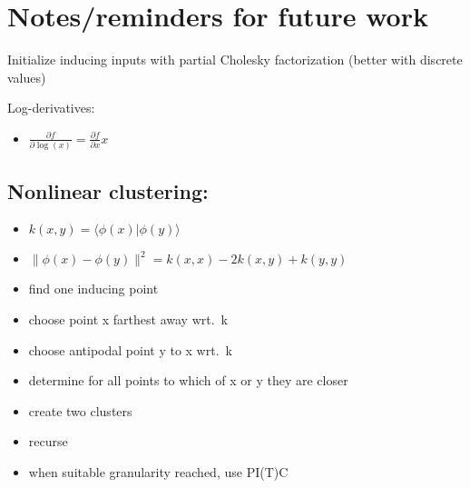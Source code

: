 \documentclass[10pt]{report}
\begin{document}
\chapter{Notes/reminders for future work}

Initialize inducing inputs with partial Cholesky factorization
(better with discrete values)

Log-derivatives:

\begin{itemize}
\item $\tfrac{\partial f}{\partial \log(x)} = \tfrac{\partial f}{\partial x} x$
\end{itemize}

\section{Nonlinear clustering:}

\begin{itemize}
\item $k(x, y) = \langle \phi(x) | \phi(y) \rangle$
\item $\|\phi(x) - \phi(y)\|^2 = k(x,x)-2k(x,y)+k(y,y)$
\item find one inducing point
\item choose point x farthest away wrt.\ k
\item choose antipodal point y to x wrt.\ k
\item determine for all points to which of x or y they are closer
\item create two clusters
\item recurse
\item when suitable granularity reached, use PI(T)C
\end{itemize}



 
\end{document}

